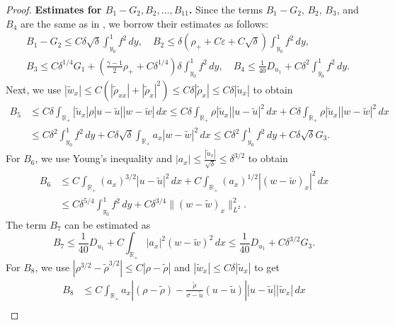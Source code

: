 \documentclass[11pt,reqno]{amsart}
\numberwithin{equation}{section} %
\newcommand{\R}{\mathbb{R}}
\begin{document}
\begin{proof}
\vspace{2mm}
\noindent\textbf{Estimates for $B_1-G_2, B_2, \ldots, B_{11}$.} 
Since the terms $B_1-G_2$, $B_2$, $B_3$, and $B_4$ are the same as in \cite[Lemma 4.5]{KOW25}, we borrow their estimates as follows:
\begin{align*}
	&B_1-G_2\le C\delta\sqrt{\delta}\int_{y_0}^1f^2\,dy,\quad B_2\le \delta(\rho_++C\varepsilon+C\sqrt{\delta})\int_{y_0}^1f^2\,dy,\\
	&B_3\le C\delta^{1/4}G_1 +\left(\frac{\gamma-1}{2}\rho_++C\delta^{1/4}\right)\delta\int_{y_0}^1f^2\,dy,\quad B_4\le \frac{1}{40}D_{u_1}+C\delta^2\int_{y_0}^1f^2\,dy.
\end{align*}
Next, we use $|\tilde{w}_x|\le C(|\tilde{\rho}_{xx}|+|\tilde{\rho}_x|^2)\le C\delta|\tilde{\rho}_x|\le C\delta|\tilde{u}_x|$ to obtain
\begin{align*}
	B_5&\le C\delta\int_{\R_+}|\tilde{u}_x|\rho|u-\tilde{u}||w-\tilde{w}|\,dx\le C\delta\int_{\R_+}\rho|\tilde{u}_x||u-\tilde{u}|^2\,dx +C\delta\int_{\R_+}\rho|\tilde{u}_x||w-\tilde{w}|^2\,dx\\
	&\le C\delta^2\int_{y_0}^1f^2\,dy + C\delta\sqrt{\delta}\int_{\R_+}a_x|w-\tilde{w}|^2\,dx\le C\delta^2\int_{y_0}^1f^2\,dy + C\delta\sqrt{\delta}G_3.
\end{align*}
For $B_6$, we use Young's inequality and $|a_x|\le \frac{|\tilde{u}_x|}{\sqrt{\delta}}\le \delta^{3/2}$ to obtain
\begin{align*}
    B_6 &\le C\int_{\R_+}(a_x)^{3/2}|u-\tilde{u}|^2\,dx +C\int_{\R_+}(a_x)^{1/2}|(w-\tilde{w})_x|^2\,dx \\
    &\le C\delta^{5/4}\int_{y_0}^1f^2\,dy+C\delta^{3/4}\|(w-\tilde{w})_x\|_{L^2}^2.
\end{align*}
The term $B_7$ can be estimated as
\[B_7\le \frac{1}{40}D_{u_1} +C\int_{\R_+}|a_x|^2(w-\tilde{w})^2\,dx\le \frac{1}{40}D_{u_1} +C\delta^{3/2}G_3.\]
For $B_8$, we use $|\rho^{3/2}-\tilde{\rho}^{3/2}|\le C|\rho-\tilde{\rho}|$ and $|\tilde{w}_x|\le C\delta|\tilde{u}_x|$ to get
\begin{align*}
	B_8%
	&\le C\int_{\R_+}a_x\left|(\rho-\tilde{\rho})-\frac{\tilde{\rho}}{\sigma-\tilde{u}}(u-\tilde{u})\right||u-\tilde{u}||\tilde{w}_x|\,dx\\

\end{align*}
\end{proof}
\end{document}

